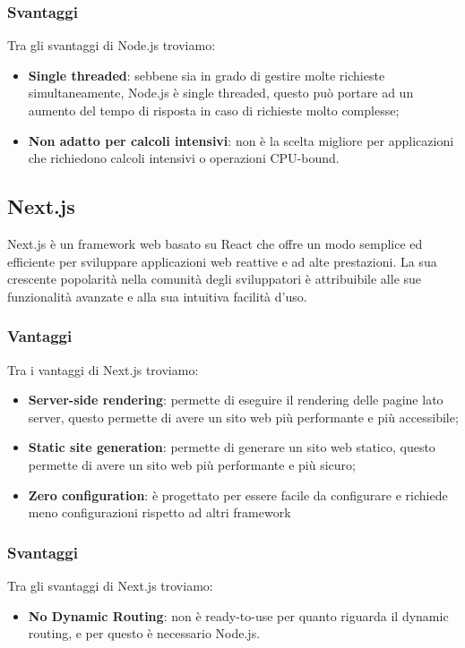 \subsubsection*{Svantaggi}
Tra gli svantaggi di Node.js troviamo:
\begin{itemize}
    \item \textbf{Single threaded}: sebbene sia in grado di gestire molte richieste simultaneamente, Node.js è single threaded, questo può portare ad un aumento del tempo di risposta in caso di richieste molto complesse;
    \item \textbf{Non adatto per calcoli intensivi}: non è la scelta migliore per applicazioni che richiedono calcoli intensivi o operazioni CPU-bound.
\end{itemize}


\subsection*{Next.js}
Next.js è un framework web basato su React che offre un modo semplice ed efficiente per sviluppare applicazioni web reattive e ad alte prestazioni. La sua crescente popolarità nella comunità degli sviluppatori è attribuibile alle sue funzionalità avanzate e alla sua intuitiva facilità d'uso.

\subsubsection*{Vantaggi}
Tra i vantaggi di Next.js troviamo:
\begin{itemize}
    \item \textbf{Server-side rendering}: permette di eseguire il rendering delle pagine lato server, questo permette di avere un sito web più performante e più accessibile;
    \item \textbf{Static site generation}: permette di generare un sito web statico, questo permette di avere un sito web più performante e più sicuro;
    \item \textbf{Zero configuration}: è progettato per essere facile da configurare e richiede meno configurazioni rispetto ad altri framework
\end{itemize}

\subsubsection*{Svantaggi}
Tra gli svantaggi di Next.js troviamo:
\begin{itemize}
    \item \textbf{No Dynamic Routing}: non è ready-to-use per quanto riguarda il dynamic routing, e per questo è necessario Node.js.
\end{itemize}


